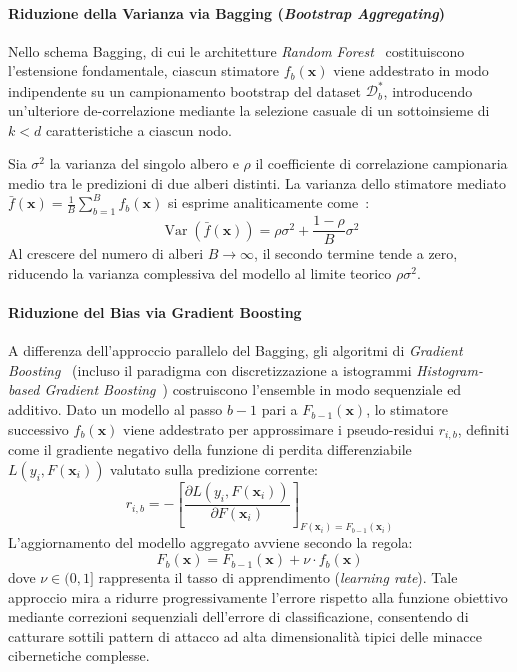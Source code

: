 \paragraph{Riduzione della Varianza via Bagging (\textit{Bootstrap Aggregating})}
Nello schema Bagging, di cui le architetture \textit{Random Forest}~\cite{breiman2001} costituiscono l'estensione fondamentale, ciascun stimatore $f_b(\mathbf{x})$ viene addestrato in modo indipendente su un campionamento bootstrap del dataset $\mathcal{D}_b^*$, introducendo un'ulteriore de-correlazione mediante la selezione casuale di un sottoinsieme di $k < d$ caratteristiche a ciascun nodo.

Sia $\sigma^2$ la varianza del singolo albero e $\rho$ il coefficiente di correlazione campionaria medio tra le predizioni di due alberi distinti. La varianza dello stimatore mediato $\bar{f}(\mathbf{x}) = \frac{1}{B} \sum_{b=1}^B f_b(\mathbf{x})$ si esprime analiticamente come~\cite{hastie2009}:
\begin{equation}
    \operatorname{Var}(\bar{f}(\mathbf{x})) = \rho \sigma^2 + \frac{1 - \rho}{B} \sigma^2
\end{equation}
Al crescere del numero di alberi $B \to \infty$, il secondo termine tende a zero, riducendo la varianza complessiva del modello al limite teorico $\rho \sigma^2$.

\paragraph{Riduzione del Bias via Gradient Boosting}
A differenza dell'approccio parallelo del Bagging, gli algoritmi di \textit{Gradient Boosting}~\cite{friedman2001} (incluso il paradigma con discretizzazione a istogrammi \textit{Histogram-based Gradient Boosting}~\cite{ke2017}) costruiscono l'ensemble in modo sequenziale ed additivo. Dato un modello al passo $b-1$ pari a $F_{b-1}(\mathbf{x})$, lo stimatore successivo $f_b(\mathbf{x})$ viene addestrato per approssimare i pseudo-residui $r_{i,b}$, definiti come il gradiente negativo della funzione di perdita differenziabile $L(y_i, F(\mathbf{x}_i))$ valutato sulla predizione corrente:
\begin{equation}
    r_{i,b} = -\left[ \frac{\partial L(y_i, F(\mathbf{x}_i))}{\partial F(\mathbf{x}_i)} \right]_{F(\mathbf{x}_i) = F_{b-1}(\mathbf{x}_i)}
\end{equation}
L'aggiornamento del modello aggregato avviene secondo la regola:
\begin{equation}
    F_b(\mathbf{x}) = F_{b-1}(\mathbf{x}) + \nu \cdot f_b(\mathbf{x})
\end{equation}
dove $\nu \in (0, 1]$ rappresenta il tasso di apprendimento (\textit{learning rate}). Tale approccio mira a ridurre progressivamente l'errore rispetto alla funzione obiettivo mediante correzioni sequenziali dell'errore di classificazione, consentendo di catturare sottili pattern di attacco ad alta dimensionalità tipici delle minacce cibernetiche complesse.

